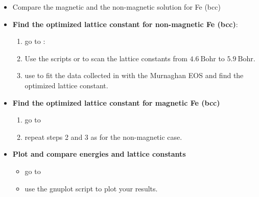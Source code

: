 \documentclass[landscape]{foils}
\begin{document}
\begin{itemize}
	\item Compare the magnetic and the non-magnetic solution for Fe (bcc) 
	\item {\bf Find the optimized lattice constant for non-magnetic Fe (bcc)}:
		\begin{enumerate}
			\item go to {\small {}
      }:
		
			\item Use the scripts {\small {}} or {\small {}} 
      to scan the lattice constants from $4.6~\mathrm{Bohr}$ to  $5.9~\mathrm{Bohr}$. 
			\item use  to fit the data collected in   with the 
          Murnaghan EOS and find the optimized lattice constant.
		\end {enumerate}
  \item {\bf Find the optimized lattice constant for magnetic Fe (bcc)}
      \begin{enumerate}
        \item go to {\small {}}
        \item repeat steps 2 and 3 as for the non-magnetic case. 
      \end{enumerate}
  \item {\bf Plot and compare energies and lattice constants}
      \begin{itemize}
        \item go to {\small {}}
        \item use the gnuplot script  to plot your results. 
      \end{itemize}
\end{itemize}
\end{document}
